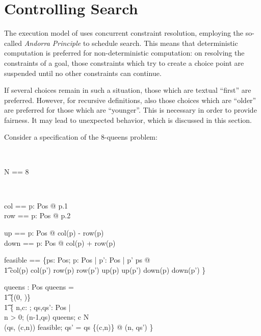 \documentclass{article}
\begin{document}
\section{Controlling Search}

The execution model of \ZAP{} uses concurrent constraint resolution,
employing the so-called \emph{Andorra Principle} to schedule search.
This means that deterministic computation is preferred for
non-deterministic computation: on resolving the constraints of
a goal, those constraints which try to create a choice point
are suspended until no other constraints can continue. 

If several choices remain in such a situation, those which are textual
``first'' are preferred. However, for recursive definitions, also
those choices which are ``older'' are preferred for those which are
``younger''. This is necessary in order to provide fairness. It may
lead to unexpected behavior, which is discussed in this section.

Consider a specification of the 8-queens problem:

\begin{zedgroup}
\begin{zdirectives}
\end{zdirectives} \\
\begin{axdef}
  N == 8 
\end{axdef}
 \\
\begin{axdef}
  col == \lambda p: Pos @ p.1 \\
  row == \lambda p: Pos @ p.2 
\end{axdef}
\begin{axdef}
  up == \lambda p: Pos @ col(p) - row(p) \\
  down == \lambda p: Pos @ col(p) + row(p) \\
\end{axdef}
\begin{axdef}
  feasible == \{\<ps: \power Pos; p: Pos |
                \forall p': Pos | p' \in ps @ \\\t1
                 col(p) \neq col(p') \land
                 row(p) \neq row(p') \land
                 up(p) \neq up(p') \land
                 down(p) \neq down(p') \}\>
\end{axdef}
\begin{axdef}
  queens : \nat \rel \power Pos
\where
  queens = \\\t1
    \{(0, \emptyset)\} \cup \\ \t1
    \{\<
      n,c: \nat; qs,qs': \power Pos | \\
      n > 0;
      (n-1,qs) \in queens;
      c  \upto N \\ 
      (qs, (c,n)) \in feasible; 
      qs' = qs \cup \{(c,n)\}
       @ 
      (n, qs') \} \>
\end{axdef}
\end{zedgroup}
\end{document}
